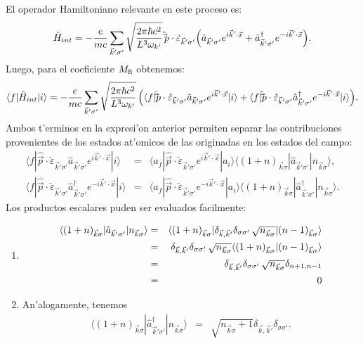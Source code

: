 El operador Hamiltoniano relevante en este proceso es:
\begin{equation}
{\hat H}_{int}=-\frac{e}{mc}\sum_{\vec{k}'\sigma'}
\sqrt{\frac{2\pi\hbar c^2}{L^3 \omega_{k'}}}
\thinspace
{\hat\vec{p}}\cdot\check{\varepsilon}_{\vec{k}'\sigma'}
\Big(
{\hat a}_{\vec{k}'\sigma'}e^{i\vec{k}'\cdot\vec{x}}+{\hat
a}^\dagger _{\vec{k}'\sigma'}e^{-i\vec{k}'\cdot\vec{x}}
\Big).
\end{equation}
Luego, para el coeficiente $M_{\rm fi}$ obtenemos:
\begin{equation}
\langle f|{\hat H}_{int}|i\rangle =-\frac{e}{mc}\sum_{\vec{k}'\sigma'}
\sqrt{\frac{2\pi\hbar c^2}{L^3 \omega_{k'}}}
\thinspace
\Big(\langle f|{\hat\vec{p}}\cdot\check{\varepsilon}_{\vec{k}'\sigma'}
{\hat a}_{\vec{k}'\sigma'}e^{i\vec{k}'\cdot\vec{x}}|i\rangle 
+
\langle f|{\hat\vec{p}}\cdot\check{\varepsilon}_{\vec{k}'\sigma'}
{\hat a}^\dagger _{\vec{k}'\sigma'}e^{-i\vec{k}'\cdot\vec{x}}|i\rangle \Big).
\end{equation}
Ambos t'erminos en la expresi'on anterior permiten separar las
contribuciones provenientes de los estados at'omicos de las originadas en los
estados del campo:
\begin{eqnarray}
\langle f|{\hat\vec{p}}\cdot\check{\varepsilon}_{\vec{k}'\sigma'}
{\hat a}_{\vec{k}'\sigma'}e^{i\vec{k}'\cdot\vec{x}}|i\rangle 
&=&
\langle
a_f|{\hat\vec{p}}\cdot\check{\varepsilon}_{\vec{k}'\sigma'}e^{i\vec{k}'\cdot\vec
{x}}|a_i\rangle \langle (1+n)_{\vec{k}\sigma}|{\hat
a}_{\vec{k}'\sigma'}|n_{\vec{k}\sigma}\rangle ,
\\
\langle f|{\hat\vec{p}}\cdot\check{\varepsilon}_{\vec{k}'\sigma'}
{\hat a}^\dagger _{\vec{k}'\sigma'}e^{-i\vec{k}'\cdot\vec{x}}|i\rangle 
&=&
\langle a_f|{\hat\vec{p}}\cdot\check{\varepsilon}_{\vec{k}'\sigma'}e^{-i\vec{k}
'\cdot\vec{x}}|a_i\rangle \langle (1+n)_{\vec{k}\sigma}|{\hat
a}^\dagger _{\vec{k}'\sigma'}|n_{\vec{k}\sigma}\rangle .
\end{eqnarray}
Los productos escalares puden ser evaluados facilmente:
\begin{enumerate}
\item\begin{eqnarray}
\langle (1+n)_{\vec{k}\sigma}|{\hat
a}_{\vec{k}'\sigma'}|n_{\vec{k}\sigma}\rangle &=&
\langle (1+n)_{\vec{k}\sigma}|\delta_{\vec{k},\vec{k}'}\delta_{\sigma\sigma'}
\thinspace\sqrt{n_{\vec{k}\sigma}}|(n-1)_{\vec{k}\sigma}\rangle 
\\
&=&\delta_{\vec{k},\vec{k}'}\delta_{\sigma\sigma'}
\thinspace\sqrt{n_{\vec{k}\sigma}}\langle
(1+n)_{\vec{k}\sigma}|(n-1)_{\vec{k}\sigma}\rangle 
\\
&=&\delta_{\vec{k},\vec{k}'}\delta_{\sigma\sigma'}
\thinspace\sqrt{n_{\vec{k}\sigma}}\delta_{n+1,n-1}
\\
&=&0
\end{eqnarray}
\item An'alogamente, tenemos
\begin{eqnarray}
\langle (1+n)_{\vec{k}\sigma}|{\hat
a}^\dagger _{\vec{k}'\sigma'}|n_{\vec{k}\sigma}\rangle &=&
\sqrt{n_{\vec{k}\sigma}+1}\delta_{\vec{k},\vec{k}'}\delta_{\sigma\sigma'}.
\end{eqnarray}
\end{enumerate}
